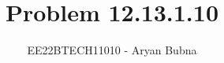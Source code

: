 \documentclass[journal,12pt,twocolumn]{IEEEtran}
\begin{document}
\title{Problem 12.13.1.10}

\author{EE22BTECH11010 - Aryan Bubna
}	


%
%
%

% 
%



% 
\end{document}
